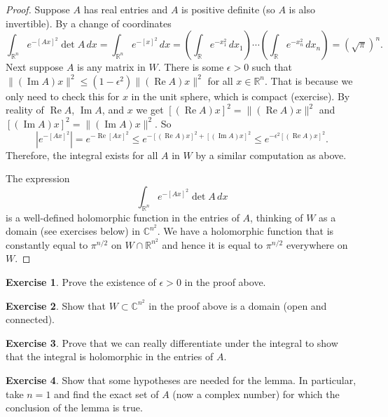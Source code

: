 \documentclass[12pt,openany]{book}
\renewcommand{\Re}{\operatorname{Re}}
\renewcommand{\Im}{\operatorname{Im}}
\newcommand{\snorm}[1]{\lVert {#1} \rVert}
\newcommand{\abs}[1]{\left\lvert {#1} \right\rvert}
\newcommand{\C}{{\mathbb{C}}}
\newcommand{\R}{{\mathbb{R}}}
\theoremstyle{plain}
\theoremstyle{remark}
\theoremstyle{definition}
\newenvironment{exbox}{%
    \def\FrameCommand{\vrule width 1pt \relax\hspace{10pt}}%
    \MakeFramed{\advance\hsize-\width\FrameRestore}%
}{%
    \endMakeFramed
}
\theoremstyle{exercise}
\newtheorem{exercise}{Exercise}[section]
\theoremstyle{example}
\begin{document}
\begin{proof}
Suppose $A$ has real entries and $A$ is positive definite (so
$A$ is also invertible).  By a
change of coordinates
\begin{equation*}
\int_{\R^n} e^{-{[Ax]}^2} \det A \, dx  =
\int_{\R^n} e^{-{[x]}^2} \, dx  =
\left(\int_\R e^{-x_1^2} \, dx_1 \right)
\cdots
\left(\int_\R e^{-x_n^2} \, dx_n \right)
=
{(\sqrt{\pi})}^n .
\end{equation*}
Next suppose $A$ is any matrix in $W$.
There is some $\epsilon > 0$
such that $\snorm{(\Im A) x}^2 \leq
(1-\epsilon^2) \snorm{(\Re A) x}^2$ for all $x \in \R^n$.  That is because
we only need to check this for $x$ in the unit sphere, which is compact
(exercise).  By reality of $\Re A$, $\Im A$, and $x$
we get
${[(\Re A)x]}^2 = \snorm{(\Re A)x}^2$ and
${[(\Im A)x]}^2 = \snorm{(\Im A)x}^2$.  So
\begin{equation*}
\abs{e^{-{[Ax]}^2}}
=
e^{-\Re {[Ax]}^2}
\leq
e^{-{[(\Re A)x]}^2 + {[(\Im A)x]}^2}
\leq
e^{-\epsilon^2 {[(\Re A)x]}^2} .
\end{equation*}
Therefore, the integral exists for all $A$ in $W$ by a similar computation as
above.

The expression
\begin{equation*}
\int_{\R^n} e^{-{[Ax]}^2} \det A \, dx
\end{equation*}
is a well-defined holomorphic function in the entries of $A$, thinking of
$W$ as a domain (see exercises below) in $\C^{n^2}$.  We have a holomorphic function that is
constantly equal to $\pi^{n/2}$ on $W \cap \R^{n^2}$ and hence it is equal
to $\pi^{n/2}$ everywhere on $W$.
\end{proof}

\begin{exbox}
\begin{exercise}
Prove the existence of $\epsilon > 0$ in the proof above.
\end{exercise}

\begin{exercise}
Show that $W \subset \C^{n^2}$ in the proof above is a domain (open and connected).
\end{exercise}

\begin{exercise}
Prove that we can really differentiate under the integral to show that the
integral is holomorphic in the entries of $A$.
\end{exercise}

\begin{exercise}
Show that some hypotheses are needed for the lemma.  In particular, take
$n=1$ and find the exact set of $A$ (now a complex number) for which
the conclusion of the lemma is true.
\end{exercise}
\end{exbox}
\end{document}
